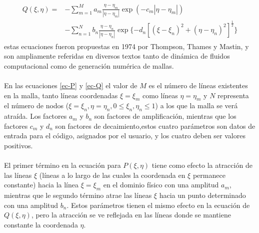 \documentclass[letterpaper, openright, 12pt]{book}
\begin{document}
				\begin{align}
					\begin{aligned}
						Q(\xi, \eta) =& - \sum_{m = 1}^{M} a_{m} \frac{\eta - \eta_{m}}{|\eta - \eta_{m}|} \exp(-c_{m}|\eta - \eta_{m}|) \\&
						- \sum_{n=1}^{N} b_{n} \frac{\eta - \eta_{n}}{| \eta - \eta_{n} |} \exp\lbrace -d_{n} \left[ \left( \xi - \xi_{n} \right)^2 + \left( \eta - \eta_{n} \right)^2 \right]^\frac{1}{2} \rbrace
					\end{aligned}
					\label{ec-Q}
				\end{align}
				estas ecuaciones fueron propuestas en 1974 por Thompson, Thames y Mastin\cite{thompson1974automatic}, y son ampliamente referidas en diversos textos tanto de dinámica de fluidos computacional como de generación numérica de mallas.
				
			\paragraph*{}
				En las ecuaciones \ref{ec-P} y \ref{ec-Q} el valor de $M$ es el número de líneas existentes en la malla, tanto líneas coordenadas $\xi = \xi_{m}$ como líneas $\eta = \eta_{m}$ y $N$ representa el número de nodos ($\xi = \xi_{n}, \eta = \eta_{n}, 0 \leq \xi_{n}, \eta_{n} \leq 1$) a los que la malla se verá atraída. Los factores $a_{m}$ y $b_{n}$ son factores de amplificación, mientras que los factores $c_{m}$ y $d_{n}$ son factores de decaimiento,estos cuatro parámetros son datos de entrada para el código, asignados por el usuario, y los cuatro deben ser valores positivos.
			
			\paragraph*{}
				El primer término en la ecuación para $P(\xi, \eta)$ tiene como efecto la atracción de las líneas $\xi$ (líneas a lo largo de las cuales la coordenada en $\xi$ permanece constante) hacia la línea $\xi = \xi_{m}$ en el dominio físico con una amplitud $a_{m}$, mientras que le segundo término atrae las líneas $\xi$ hacia un punto determinado con una amplitud $b_{n}$. Estos parámetros tienen el mismo efecto en la ecuación de $Q(\xi, \eta)$, pero la atracción se ve reflejada en las líneas donde se mantiene constante la coordenada $\eta$.
\end{document}
